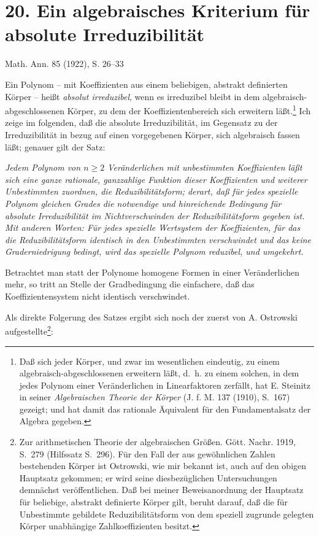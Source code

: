 \documentclass[11pt]{article}
\begin{document}
\setcounter{footnote}{0}
\section*{20. Ein algebraisches Kriterium für absolute Irreduzibilität}
\begin{center}
Math. Ann. 85 (1922), S. 26--33
\end{center}

Ein Polynom -- mit Koeffizienten aus einem beliebigen, abstrakt definierten Körper -- heißt \emph{absolut irreduzibel}, wenn es irreduzibel bleibt in dem algebraisch-abgeschlossenen Körper, zu dem der Koeffizientenbereich sich erweitern läßt.\footnote{Daß sich jeder Körper, und zwar im wesentlichen eindeutig, zu einem algebraisch-abgeschlossenen erweitern läßt, d.~h. zu einem solchen, in dem jedes Polynom einer Veränderlichen in Linearfaktoren zerfällt, hat E. Steinitz in seiner \emph{Algebraischen Theorie der Körper} (J. f. M. 137 (1910), S.~167) gezeigt; und hat damit das rationale Äquivalent für den Fundamentalsatz der Algebra gegeben.} Ich zeige im folgenden, daß die absolute Irreduzibilität, im Gegensatz zu der Irreduzibilität in bezug auf einen vorgegebenen Körper, sich algebraisch fassen läßt; genauer gilt der Satz:

\emph{Jedem Polynom von $n\ge2$ Veränderlichen mit unbestimmten Koeffizienten läßt sich eine ganze rationale, ganzzahlige Funktion dieser Koeffizienten und weiterer Unbestimmten zuordnen, die Reduzibilitätsform; derart, daß für jedes spezielle Polynom gleichen Grades die notwendige und hinreichende Bedingung für absolute Irreduzibilität im Nichtverschwinden der Reduzibilitätsform gegeben ist. Mit anderen Worten: Für jedes spezielle Wertsystem der Koeffizienten, für das die Reduzibilitätsform identisch in den Unbestimmten verschwindet und das keine Graderniedrigung bedingt, wird das spezielle Polynom reduzibel, und umgekehrt.}

Betrachtet man statt der Polynome homogene Formen in einer Veränderlichen mehr, so tritt an Stelle der Gradbedingung die einfachere, daß das Koeffizientensystem nicht identisch verschwindet.

Als direkte Folgerung des Satzes ergibt sich noch der zuerst von A. Ostrowski aufgestellte\footnote{Zur arithmetischen Theorie der algebraischen Größen. Gött. Nachr. 1919, S.~279 (Hilfssatz S.~296). Für den Fall der aus gewöhnlichen Zahlen bestehenden Körper ist Ostrowski, wie mir bekannt ist, auch auf den obigen Hauptsatz gekommen; er wird seine diesbezüglichen Untersuchungen demnächst veröffentlichen. Daß bei meiner Beweisanordnung der Hauptsatz für beliebige, abstrakt definierte Körper gilt, beruht darauf, daß die für Unbestimmte gebildete Reduzibilitätsform von dem speziell zugrunde gelegten Körper unabhängige Zahlkoeffizienten besitzt.}:
\end{document}
